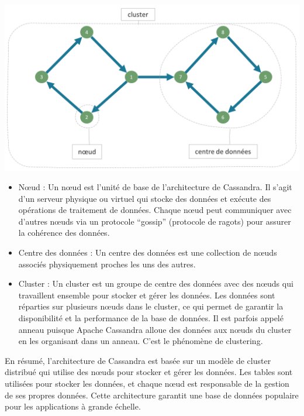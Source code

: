 \documentclass[12pt, letterpaper]{report}
\begin{document}
\begin{center}
	\includegraphics[width=\textwidth]{architecture}
\end{center}
\begin{itemize}
  \item Nœud : Un nœud est l'unité de base de l'architecture de Cassandra. Il s'agit d'un serveur physique ou virtuel qui stocke des données et exécute des opérations de traitement de données. Chaque nœud peut communiquer avec d'autres nœuds via un protocole “gossip” (protocole de ragots) pour assurer la cohérence des données.
  \item Centre des données : Un centre des données est une collection de nœuds associés physiquement proches les uns des autres.
  \item Cluster : Un cluster est un groupe de centre des données avec des nœuds qui travaillent ensemble pour stocker et gérer les données. Les données sont réparties sur plusieurs nœuds dans le cluster, ce qui permet de garantir la disponibilité et la performance de la base de données. Il est parfois appelé anneau puisque Apache Cassandra alloue des données aux nœuds du cluster en les organisant dans un anneau. C’est le phénomène de clustering.
\end{itemize}

En résumé, l'architecture de Cassandra est basée sur un modèle de cluster distribué qui utilise des nœuds pour stocker et gérer les données. Les tables sont utilisées pour stocker les données, et chaque nœud est responsable de la gestion de ses propres données. Cette architecture garantit une base de données populaire pour les applications à grande échelle.
\end{document}
